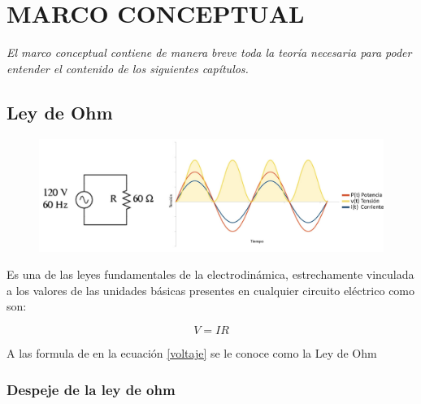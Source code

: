 

\chapter{ MARCO CONCEPTUAL }

\textit{El marco conceptual contiene de manera breve toda la teoría necesaria para poder entender el contenido de los siguientes capítulos.}

\section{ Ley de Ohm }

\begin{figure}[H]
	\begin{center}
 		\includegraphics[width = .8\textwidth]{Tesis/Imagenes/resistiva.jpg}
	\label{RESISTIVA}
    \end{center} 
\end{figure}

Es una de las leyes fundamentales de la electrodinámica, estrechamente vinculada a los valores de las unidades básicas presentes en cualquier circuito eléctrico como son:

\begin{equation}
V = IR  
\label{voltaje}
\end{equation}

A las formula de en la ecuación \ref{voltaje} se le conoce como la Ley de Ohm

\subsection{ Despeje de la ley de ohm }


